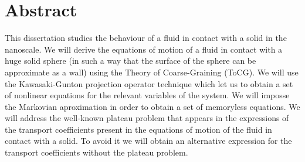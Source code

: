 \documentclass[b5paper,openright,10pt]{book}
\begin{document}
%
%
%
%
%


\pagestyle{Contents}  %
\tableofcontents %

\chapter*{Abstract} %
\pagestyle{noHeader}  %
This dissertation studies the behaviour of a fluid in contact with a solid in the nanoscale. We will derive the equations of motion of a fluid in contact with a huge solid sphere (in such a way that the surface of the sphere can be approximate as a wall) using the Theory of Coarse-Graining (ToCG).
We will use the Kawasaki-Gunton projection operator technique which let us to obtain a set of nonlinear equations for the relevant variables of the system. We will imposse the Markovian aproximation in order to obtain a set of memoryless equations.
We will address the well-known plateau problem  that appears in the expressions of the transport coefficients present in the equations of motion of the fluid in contact with a solid. To avoid it we will obtain an alternative expression for the transport coefficients without the plateau problem. 
\end{document}
